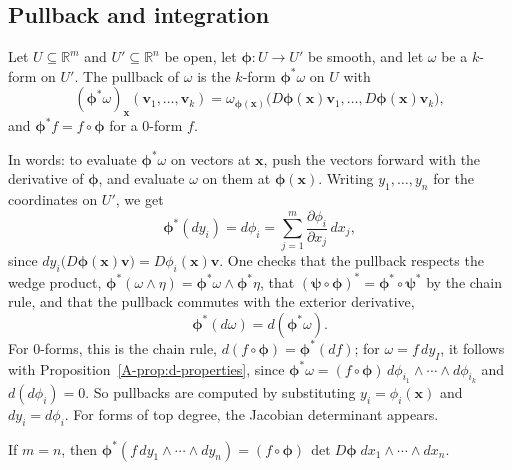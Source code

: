 \subsection{Pullback and integration}

\begin{definition}[Pullback]\label{A-def:pullback}
    Let $U \subseteq \mathbb{R}^m$ and $U' \subseteq \mathbb{R}^n$ be open, let $\boldsymbol{\phi}: U \to U'$ be smooth, and let $\omega$ be a $k$-form on $U'$. The pullback of $\omega$ is the $k$-form $\boldsymbol{\phi}^*\omega$ on $U$ with
    \[(\boldsymbol{\phi}^*\omega)_{\mathbf{x}}(\mathbf{v}_1, \ldots, \mathbf{v}_k) = \omega_{\boldsymbol{\phi}(\mathbf{x})}\big(D\boldsymbol{\phi}(\mathbf{x})\mathbf{v}_1, \ldots, D\boldsymbol{\phi}(\mathbf{x})\mathbf{v}_k\big),\]
    and $\boldsymbol{\phi}^*f = f \circ \boldsymbol{\phi}$ for a $0$-form $f$.
\end{definition}

In words: to evaluate $\boldsymbol{\phi}^*\omega$ on vectors at $\mathbf{x}$, push the vectors forward with the derivative of $\boldsymbol{\phi}$, and evaluate $\omega$ on them at $\boldsymbol{\phi}(\mathbf{x})$. Writing $y_1, \ldots, y_n$ for the coordinates on $U'$, we get
\[\boldsymbol{\phi}^*(dy_i) = d\phi_i = \sum_{j=1}^m \frac{\partial \phi_i}{\partial x_j}\, dx_j,\]
since $dy_i\big(D\boldsymbol{\phi}(\mathbf{x})\mathbf{v}\big) = D\phi_i(\mathbf{x})\mathbf{v}$. One checks that the pullback respects the wedge product, $\boldsymbol{\phi}^*(\omega \wedge \eta) = \boldsymbol{\phi}^*\omega \wedge \boldsymbol{\phi}^*\eta$, that $(\boldsymbol{\psi} \circ \boldsymbol{\phi})^* = \boldsymbol{\phi}^* \circ \boldsymbol{\psi}^*$ by the chain rule, and that the pullback commutes with the exterior derivative,
\[\boldsymbol{\phi}^*(d\omega) = d(\boldsymbol{\phi}^*\omega).\]
For $0$-forms, this is the chain rule, $d(f \circ \boldsymbol{\phi}) = \boldsymbol{\phi}^*(df)$; for $\omega = f\, dy_I$, it follows with Proposition~\ref{A-prop:d-properties}, since $\boldsymbol{\phi}^*\omega = (f \circ \boldsymbol{\phi})\, d\phi_{i_1} \wedge \cdots \wedge d\phi_{i_k}$ and $d(d\phi_i) = 0$. So pullbacks are computed by substituting $y_i = \phi_i(\mathbf{x})$ and $dy_i = d\phi_i$. For forms of top degree, the Jacobian determinant appears.

\begin{proposition}\label{A-prop:pullback-top}
    If $m = n$, then $\boldsymbol{\phi}^*(f\, dy_1 \wedge \cdots \wedge dy_n) = (f \circ \boldsymbol{\phi})\, \det D\boldsymbol{\phi}\; dx_1 \wedge \cdots \wedge dx_n$.
\end{proposition}

